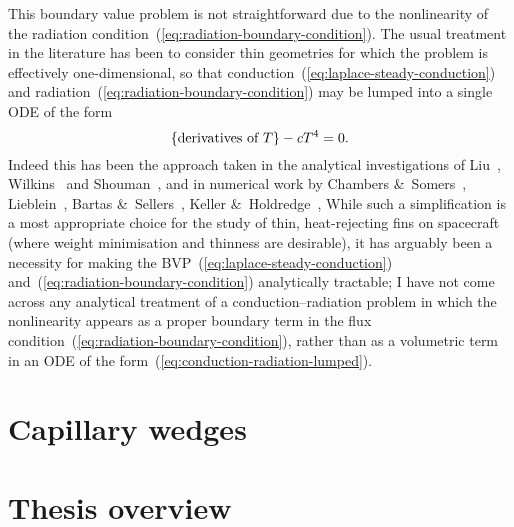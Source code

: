 This boundary value problem is not straightforward
due to the nonlinearity of
the radiation condition~(\ref{eq:radiation-boundary-condition}).
The usual treatment in the literature has been to consider thin geometries
for which the problem is effectively one-dimensional,
so that conduction~(\ref{eq:laplace-steady-conduction})
and radiation~(\ref{eq:radiation-boundary-condition})
may be lumped into a single ODE of the form
\begin{equation}
  \{\text{derivatives of~$T$}\} - c T^4 = 0.
  \label{eq:conduction-radiation-lumped}
\end{equation}
Indeed this has been the approach taken in the analytical investigations of
Liu~\cite{liu-1960-minimum-rectangular-radiating-fins},
Wilkins~\cite{
  wilkins-1960-minumum-mass-fins-radiation,
  wilkins-1961-minimum-mass-fins-thickness,
  wilkins-1962-minimum-mass-fins-gradients,
  wilkins-1974-optimum-shapes-convection-radiation
}
and
Shouman~\cite{shouman-1968-exact-radiation-convection-fin},
and in numerical work by
Chambers \&~Somers~\cite{chambers-1959-radiation-fin-efficiency-circular},
Lieblein~\cite{lieblein-1959-radiant-fin-constant-thickness},
Bartas \&~Sellers~\cite{bartas-1960-radiation-fin-effectiveness},
Keller \&~Holdredge~\cite{keller-1970-radiation-annular-fins-trapezoidal},
While such a simplification is a most appropriate choice
for the study of thin, heat-rejecting fins on spacecraft
(where weight minimisation and thinness are desirable),
it has arguably been a necessity
for making the BVP~(\ref{eq:laplace-steady-conduction})
and~(\ref{eq:radiation-boundary-condition}) analytically tractable;
I have not come across any analytical treatment
of a conduction--radiation problem
in which the nonlinearity appears as a proper boundary term
in the flux condition~(\ref{eq:radiation-boundary-condition}),
rather than as a volumetric term in an ODE
of the form~(\ref{eq:conduction-radiation-lumped}).

\section{Capillary wedges}

\section{Thesis overview}
